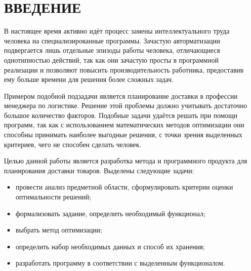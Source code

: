 \section*{ВВЕДЕНИЕ}

В настоящее время активно идёт процесс замены интеллектуального труда человека на специализированные программы. Зачастую авторматизации подвергается лишь отдельные эпизоды работы человека, отличающиеся однотипностью действий, так как они зачастую просты в программной реализации и позволяют повысить производительность работника, предоставив ему больше времени для решения более сложных задач.

Примером подобной подзадачи является планирование доставки в профессии менеджера по логистике. Решение этой проблемы должно учитывать достаточно большое количество факторов. Подобные задачи удаётся решать при помощи программ, так как с использованием математических методов оптимизации они способны принимать наиболее выгодные решения, с точки зрения выделенных критериев, чего не способен сделать человек.

Целью данной работы является разработка метода и программного продукта для планирования доставки товаров. 
Выделены следующие задачи:
\begin{itemize}
	\item провести анализ предметной области, сформулировать критерии оценки оптимальности решений;
	\item формализовать задание, определить необходимый функционал;
	\item выбрать метод оптимизации;
	\item определить набор необходимых данных и способ их хранения;
	\item разработать программу в соответствии с выделенным функционалом. 
	
\end{itemize}

\pagebreak